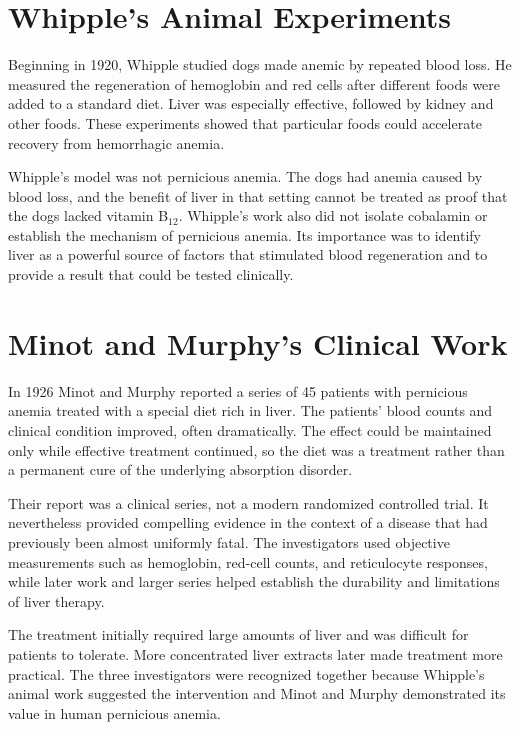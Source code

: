 \section{Whipple's Animal Experiments}

Beginning in 1920, Whipple studied dogs made anemic by repeated blood loss. He measured the regeneration of hemoglobin and red cells after different foods were added to a standard diet. Liver was especially effective, followed by kidney and other foods. These experiments showed that particular foods could accelerate recovery from hemorrhagic anemia.

Whipple's model was not pernicious anemia. The dogs had anemia caused by blood loss, and the benefit of liver in that setting cannot be treated as proof that the dogs lacked vitamin B$_{12}$. Whipple's work also did not isolate cobalamin or establish the mechanism of pernicious anemia. Its importance was to identify liver as a powerful source of factors that stimulated blood regeneration and to provide a result that could be tested clinically.

\section{Minot and Murphy's Clinical Work}

In 1926 Minot and Murphy reported a series of 45 patients with pernicious anemia treated with a special diet rich in liver. The patients' blood counts and clinical condition improved, often dramatically. The effect could be maintained only while effective treatment continued, so the diet was a treatment rather than a permanent cure of the underlying absorption disorder.

Their report was a clinical series, not a modern randomized controlled trial. It nevertheless provided compelling evidence in the context of a disease that had previously been almost uniformly fatal. The investigators used objective measurements such as hemoglobin, red-cell counts, and reticulocyte responses, while later work and larger series helped establish the durability and limitations of liver therapy.

The treatment initially required large amounts of liver and was difficult for patients to tolerate. More concentrated liver extracts later made treatment more practical. The three investigators were recognized together because Whipple's animal work suggested the intervention and Minot and Murphy demonstrated its value in human pernicious anemia.

